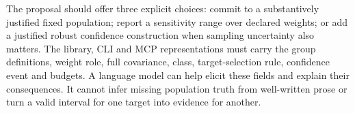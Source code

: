 The proposal should offer three explicit choices: commit to a substantively
justified fixed population; report a sensitivity range over declared weights;
or add a justified robust confidence construction when sampling uncertainty
also matters. The library, CLI and MCP representations must carry the group
definitions, weight role, full covariance, class, target-selection rule,
confidence event and budgets. A language model can help elicit these fields
and explain their consequences. It cannot infer missing population truth from
well-written prose or turn a valid interval for one target into evidence for
another.
